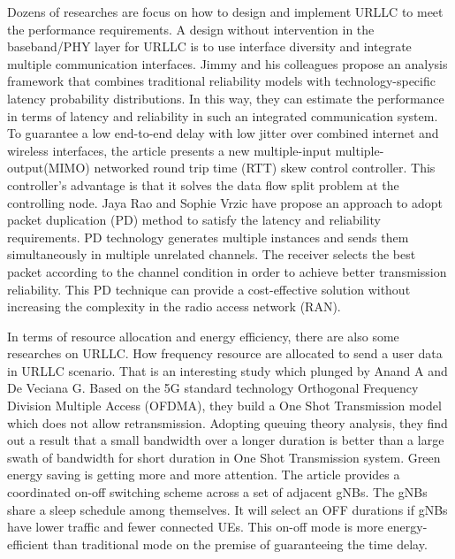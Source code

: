 \documentclass[runningheads]{llncs}
\begin{document}
Dozens of researches are focus on how to design and implement URLLC to meet the performance requirements.
A design without intervention in the baseband/PHY layer for URLLC is to use interface diversity and integrate multiple communication interfaces.
Jimmy and his colleagues propose an analysis framework that combines traditional reliability models with technology-specific latency probability distributions\cite{article_interface}. 
In this way, they can estimate the performance in terms of latency and reliability in such an integrated communication system.
To guarantee a low end-to-end delay with low jitter over combined internet and wireless interfaces, the article \cite{article_multiconnectivity} presents a new multiple-input multiple-output(MIMO) networked round trip time (RTT) skew control controller.
This controller's advantage is that it solves the data flow split problem at the controlling node. 
Jaya Rao and Sophie Vrzic have propose an approach to adopt packet duplication (PD) method to satisfy the latency and reliability requirements\cite{article_PD}. 
PD technology generates multiple instances and sends them simultaneously in multiple unrelated channels. 
The receiver selects the best packet according to the channel condition in order to achieve better transmission reliability. 
This PD technique can provide a cost-effective solution without increasing the complexity in the radio access network (RAN).

In terms of resource allocation and energy efficiency, there are also some researches on URLLC.
How frequency resource are allocated to send a user data in URLLC scenario.
That is an interesting study which plunged by Anand A and De Veciana G\cite{article_Anand}.
Based on the 5G standard technology Orthogonal Frequency Division Multiple Access (OFDMA), they build a One Shot Transmission model which does not allow retransmission.
Adopting queuing theory analysis, they find out a result that a small bandwidth over a longer duration is better than a large swath of bandwidth for short duration in One Shot Transmission system.
Green energy saving is getting more and more attention.
The article \cite{article_Energy} provides a coordinated on-off switching scheme across a set of adjacent gNBs.
The gNBs share a sleep schedule among themselves. 
It will select an OFF durations if gNBs have lower traffic and fewer connected UEs.
This on-off mode is more energy-efficient than traditional mode on the premise of guaranteeing the time delay.
\end{document}
